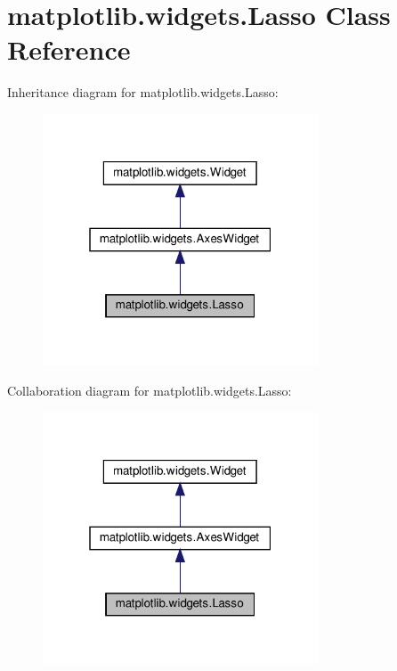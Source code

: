 \hypertarget{classmatplotlib_1_1widgets_1_1Lasso}{}\section{matplotlib.\+widgets.\+Lasso Class Reference}
\label{classmatplotlib_1_1widgets_1_1Lasso}


Inheritance diagram for matplotlib.\+widgets.\+Lasso\+:
\nopagebreak
\begin{figure}[H]
\begin{center}
\leavevmode
\includegraphics[width=232pt]{classmatplotlib_1_1widgets_1_1Lasso__inherit__graph}
\end{center}
\end{figure}


Collaboration diagram for matplotlib.\+widgets.\+Lasso\+:
\nopagebreak
\begin{figure}[H]
\begin{center}
\leavevmode
\includegraphics[width=232pt]{classmatplotlib_1_1widgets_1_1Lasso__coll__graph}
\end{center}
\end{figure}
